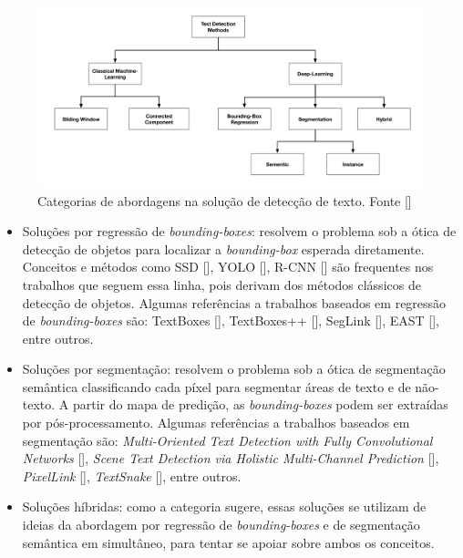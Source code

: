 \begin{figure}
    \centering
    \includegraphics[width=\textwidth]{figs/theory-detection-categories.png}
    \caption{Categorias de abordagens na solução de detecção de texto. Fonte []}
    \label{fig:theory-detection-categories}
\end{figure}

\begin{itemize}
    \item Soluções por regressão de \textit{bounding-boxes}: resolvem o problema sob a ótica de detecção de objetos para localizar a \textit{bounding-box} 
    esperada diretamente. Conceitos e métodos como SSD [], YOLO [], R-CNN [] são frequentes nos trabalhos 
    que seguem essa linha, pois derivam dos métodos clássicos de detecção de objetos. Algumas referências a trabalhos baseados em regressão de \textit{bounding-boxes} 
    são: TextBoxes [], TextBoxes++ [], SegLink [], EAST [], entre outros.

    \item Soluções por segmentação: resolvem o problema sob a ótica de segmentação semântica classificando cada píxel para segmentar áreas de texto e de 
    não-texto. A partir do mapa de predição, as \textit{bounding-boxes} podem ser extraídas por pós-processamento. Algumas referências a trabalhos baseados 
    em segmentação são: \textit{Multi-Oriented Text Detection with Fully Convolutional Networks} [], \textit{Scene Text Detection 
    via Holistic Multi-Channel Prediction} [], \textit{PixelLink} [], \textit{TextSnake} [], 
    entre outros.

    \item Soluções híbridas: como a categoria sugere, essas soluções se utilizam de ideias da abordagem por regressão de \textit{bounding-boxes} e de segmentação 
    semântica em simultâneo, para tentar se apoiar sobre ambos os conceitos.
\end{itemize}

